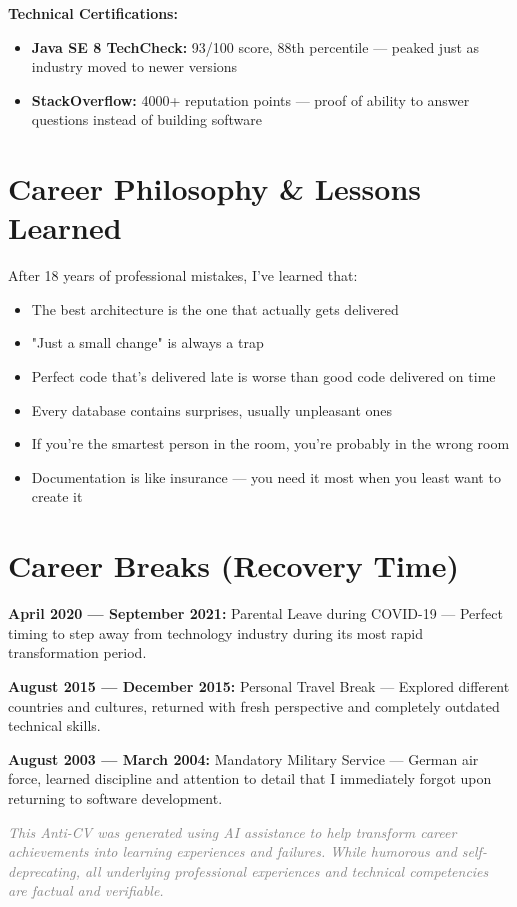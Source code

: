 \documentclass[11pt,a4paper]{article}
\begin{document}
\textbf{Technical Certifications:}
\begin{itemize}[leftmargin=1.5em,itemsep=0.2em]
\item \textbf{Java SE 8 TechCheck:} 93/100 score, 88th percentile — peaked just as industry moved to newer versions
\item \textbf{StackOverflow:} 4000+ reputation points — proof of ability to answer questions instead of building software
\end{itemize}

\section*{Career Philosophy \& Lessons Learned}

After 18 years of professional mistakes, I've learned that:
\begin{itemize}[leftmargin=1.5em,itemsep=0.2em]
\item The best architecture is the one that actually gets delivered
\item "Just a small change" is always a trap
\item Perfect code that's delivered late is worse than good code delivered on time
\item Every database contains surprises, usually unpleasant ones
\item If you're the smartest person in the room, you're probably in the wrong room
\item Documentation is like insurance — you need it most when you least want to create it
\end{itemize}

\section*{Career Breaks (Recovery Time)}

\textbf{April 2020 — September 2021:} Parental Leave during COVID-19 — Perfect timing to step away from technology industry during its most rapid transformation period.

\textbf{August 2015 — December 2015:} Personal Travel Break — Explored different countries and cultures, returned with fresh perspective and completely outdated technical skills.

\textbf{August 2003 — March 2004:} Mandatory Military Service — German air force, learned discipline and attention to detail that I immediately forgot upon returning to software development.

\vspace{2em}

\begin{center}
\textcolor{gray}{\footnotesize \textit{This Anti-CV was generated using AI assistance to help transform career achievements into learning experiences and failures. While humorous and self-deprecating, all underlying professional experiences and technical competencies are factual and verifiable.}}
\end{center}
\end{document}
